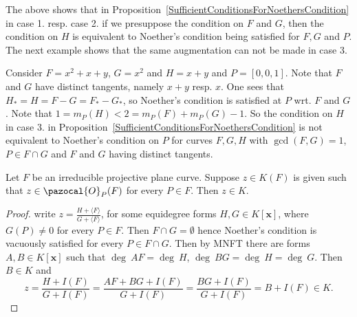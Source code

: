     \begin{remark}
        The above shows that in Proposition~\ref{SufficientConditionsForNoethersCondition} in case 1. resp. case 2. if we presuppose the condition on $F$ and $G$, then the condition on $H$ is equivalent to Noether's condition being satisfied for $F,G$ and $P$. The next example shows that the same augmentation can not be made in case 3.
    \end{remark}
    \begin{example}
        Consider $F=x^2+x+y$, $G=x^2$ and $H=x+y$ and $P=[0,0,1]$. Note that $F$ and $G$ have distinct tangents, namely $x+y$ resp. $x$. One sees that $H_\ast = H=F-G=F_\ast-G_\ast$, so Noether's condition is satisfied at $P$ wrt. $F$ and $G$. Note that $1=m_P(H)<2=m_P(F)+m_P(G)-1$. So the condition on $H$ in case 3. in Proposition~\ref{SufficientConditionsForNoethersCondition} is not equivalent to Noether's condition on $P$ for curves $F,G, H$ with $\gcd(F,G)=1$, $P\in F\cap G$ and $F$ and $G$ having distinct tangents.
    \end{example}
    \begin{proposition}
        Let $F$ be an irreducible projective plane curve. Suppose $z\in K(F)$ is given such that $z\in \pazocal{O}_P(F)$ for every $P\in F$. Then $z\in K$.
    \end{proposition}
    \begin{proof}
        write $z=\frac{H+\langle F\rangle}{G+\langle F\rangle} $, for some equidegree forms $H,G\in K[\mathbf{x}]$, where $G(P)\neq 0$ for every $P\in F$. Then $F\cap G=\emptyset$ hence Noether's condition is vacuously satisfied for every $P\in F\cap G$. Then by MNFT there are forms $A,B\in K[\mathbf{x}]$ such that $\deg \ AF = \deg \ H$, $\deg \ BG= \deg \ H = \deg \ G $. Then $B\in K$ and 
        $$z = \frac{H+I(F)}{G+ I(F)} = \frac{AF+BG+I(F)}{G+I(F)}= \frac{BG+ I(F)}{G+ I(F)}=B+I(F)\in K.$$
    \end{proof}
